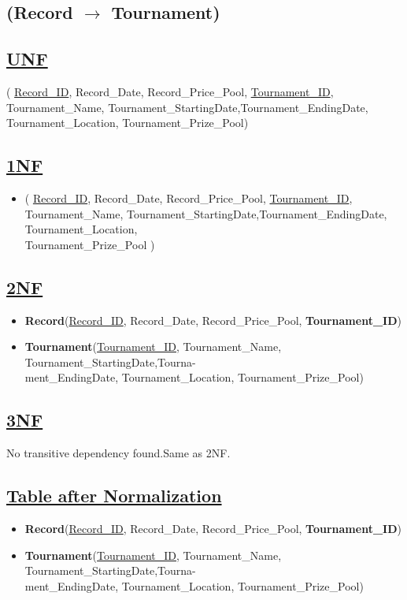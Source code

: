 \subsection{\texorpdfstring{\centering (Record $\rightarrow$ Tournament)}{(Record - Tournament)}}

\subsection*{\underline{UNF}}
(
\underline{Record\_ID}, Record\_Date, Record\_Price\_Pool,
\underline{Tournament\_ID}, Tournament\_Name, Tournament\_StartingDate,Tournament\_EndingDate, Tournament\_Location, Tournament\_Prize\_Pool)


\subsection*{\underline{1NF}}

\begin{itemize}
    \item
          (
          \underline{Record\_ID}, Record\_Date, Record\_Price\_Pool,
          \underline{Tournament\_ID}, Tournament\_Name, Tournament\_StartingDate,Tournament\_EndingDate, Tournament\_Location, \\Tournament\_Prize\_Pool
          )
\end{itemize}


\subsection*{\underline{2NF}}
\begin{itemize}
    \item \textbf{Record}(\underline{Record\_ID}, Record\_Date, Record\_Price\_Pool, \textbf{Tournament\_ID})
    \item \textbf{Tournament}(\underline{Tournament\_ID}, Tournament\_Name, Tournament\_StartingDate,Tourna-\\ment\_EndingDate, Tournament\_Location, Tournament\_Prize\_Pool)
\end{itemize}

\subsection*{\underline{3NF}}
No transitive dependency found.Same as 2NF.

\subsection*{\underline{Table after Normalization}}
\begin{itemize}
    \item \textbf{Record}(\underline{Record\_ID}, Record\_Date, Record\_Price\_Pool, \textbf{Tournament\_ID})
    \item \textbf{Tournament}(\underline{Tournament\_ID}, Tournament\_Name, Tournament\_StartingDate,Tourna-\\ment\_EndingDate, Tournament\_Location, Tournament\_Prize\_Pool)
\end{itemize}

\clearpage
